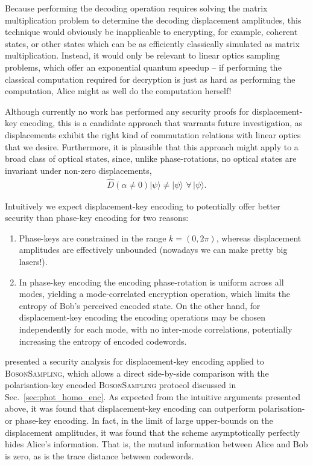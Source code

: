 \documentclass[aps, rmp, twocolumn, amsmath, amssymb, nofootinbib, superscriptaddress, longbibliography, floatfix, table-of-contents, eqsecnum]{revtex4-1}
\newcommand{\ket}[1]{|#1\rangle}
\begin{document}
Because performing the decoding operation requires solving the matrix multiplication problem to determine the decoding displacement amplitudes, this technique would obviously be inapplicable to encrypting, for example, coherent states, or other states which can be as efficiently classically simulated as matrix multiplication. Instead, it would only be relevant to linear optics sampling problems, which offer an exponential quantum speedup -- if performing the classical computation required for decryption is just as hard as performing the computation, Alice might as well do the computation herself!

Although currently no work has performed any security proofs for displacement-key encoding, this is a candidate approach that warrants future investigation, as displacements exhibit the right kind of commutation relations with linear optics that we desire. Furthermore, it is plausible that this approach might apply to a broad class of optical states, since, unlike phase-rotations, no optical states are invariant under non-zero displacements,
\begin{align}
\hat{D}(\alpha\neq 0)\ket\psi \neq \ket\psi\,\,\forall\,\ket\psi.
\end{align}

Intuitively we expect displacement-key encoding to potentially offer better security than phase-key encoding for two reasons:
\begin{enumerate}
\item Phase-keys are constrained in the range \mbox{$k=(0,2\pi)$}, whereas displacement amplitudes are effectively unbounded (nowadays we can make pretty big lasers!).
\item In phase-key encoding the encoding phase-rotation is uniform across all modes, yielding a mode-correlated encryption operation, which limits the entropy of Bob's perceived encoded state. On the other hand, for displacement-key encoding the encoding operations may be chosen independently for each mode, with no inter-mode correlations, potentially increasing the entropy of encoded codewords.
\end{enumerate}

\cite{???} presented a security analysis for displacement-key encoding applied to \textsc{BosonSampling}, which allows a direct side-by-side comparison with the polarisation-key encoded \textsc{BosonSampling} protocol discussed in Sec.~\ref{sec:phot_homo_enc}. As expected from the intuitive arguments presented above, it was found that displacement-key encoding can outperform polarisation- or phase-key encoding. In fact, in the limit of large upper-bounds on the displacement amplitudes, it was found that the scheme asymptotically perfectly hides Alice's information. That is, the mutual information between Alice and Bob is zero, as is the trace distance between codewords.
\end{document}
